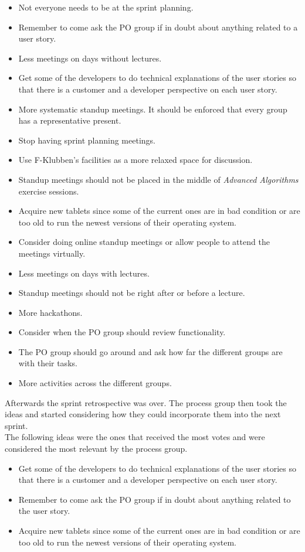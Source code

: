 \begin{itemize}
    \item Not everyone needs to be at the sprint planning.
    \item Remember to come ask the PO group if in doubt about anything related to a user story.
    \item Less meetings on days without lectures.
    \item Get some of the developers to do technical explanations of the user stories so that there is a customer and a developer perspective on each user story.
    \item More systematic standup meetings. It should be enforced that every group has a representative present.
    \item Stop having sprint planning meetings.
    \item Use F-Klubben's facilities as a more relaxed space for discussion. 
    \item Standup meetings should not be placed in the middle of \textit{Advanced Algorithms} exercise sessions.
    \item Acquire new tablets since some of the current ones are in bad condition or are too old to run the newest versions of their operating system.
    \item Consider doing online standup meetings or allow people to attend the meetings virtually.
    \item Less meetings on days with lectures.
    \item Standup meetings should not be right after or before a lecture.
    \item More hackathons.
    \item Consider when the PO group should review functionality. 
    \item The PO group should go around and ask how far the different groups are with their tasks.
    \item More activities across the different groups.
\end{itemize}
Afterwards the sprint retrospective was over.
The process group then took the ideas and started considering how they could incorporate them into the next sprint.
\\
\noindent
The following ideas were the ones that received the most votes and were considered the most relevant by the process group.
\begin{itemize}
    \item Get some of the developers to do technical explanations of the user stories so that there is a customer and a developer perspective on each user story.
    \item Remember to come ask the PO group if in doubt about anything related to the user story.
    \item Acquire new tablets since some of the current ones are in bad condition or are too old to run the newest versions of their operating system.
\end{itemize}
